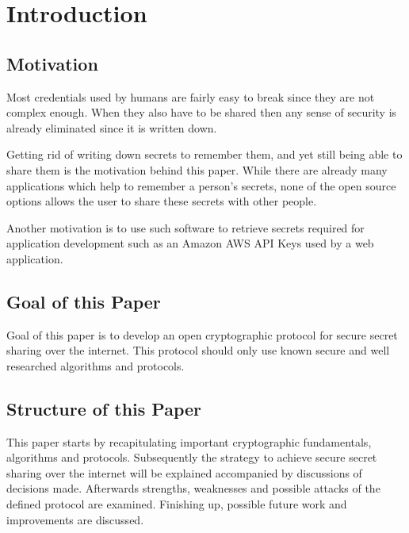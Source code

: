 \chapter{Introduction}
\label{cha:Introduction}

\section{Motivation}
\label{sec:Motivation}

Most credentials used by humans are fairly easy to break since they are not
complex enough. When they also have to be shared then any sense of security is
already eliminated since it is written down.

Getting rid of writing down secrets to remember them, and yet still being able
to share them is the motivation behind this paper. While there are already many
applications which help to remember a person's secrets, none of the open source
options allows the user to share these secrets with other people.

Another motivation is to use such software to retrieve secrets required for
application development such as an Amazon AWS API Keys used by a web
application.

\section{Goal of this Paper}
\label{sec:GoalOfThisPaper}

Goal of this paper is to develop an open cryptographic protocol for secure
secret sharing over the internet. This protocol should only use known secure
and well researched algorithms and protocols.

\section{Structure of this Paper}
\label{sec:StructureOfThisPaper}

This paper starts by recapitulating important cryptographic fundamentals,
algorithms and protocols. Subsequently the strategy to achieve secure secret
sharing over the internet will be explained accompanied by discussions of
decisions made. Afterwards strengths, weaknesses and possible attacks of the
defined protocol are examined. Finishing up, possible future work and
improvements are discussed.
